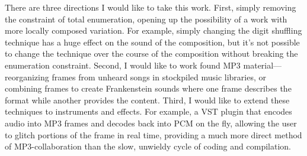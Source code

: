 \documentclass{thesis}
\begin{document}
There are three directions I would like to take this work. First, simply removing the constraint of total enumeration, opening up the possibility of a work with more locally composed variation. For example, simply changing the digit shuffling technique has a huge effect on the sound of the composition, but it's not possible to change the technique over the course of the composition without breaking the enumeration constraint. Second, I would like to work found MP3 material---reorganizing frames from unheard songs in stockpiled music libraries, or combining frames to create Frankenstein sounds where one frame describes the format while another provides the content. Third, I would like to extend these techniques to instruments and effects. For example, a VST plugin that encodes audio into MP3 frames and decodes back into PCM on the fly, allowing the user to glitch portions of the frame in real time, providing a much more direct method of MP3-collaboration than the slow, unwieldy cycle of coding and compilation.

\begin{singlespace}

\end{singlespace}
\end{document}
